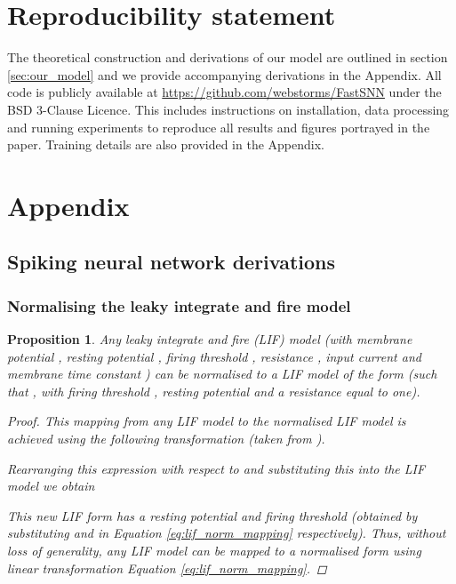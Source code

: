 \documentclass{article} \usepackage{iclr2023_conference,times}
\newtheorem{proposition}[theorem]{Proposition}
\begin{document}
\section{Reproducibility statement}
The theoretical construction and derivations of our model are outlined in section \ref{sec:our_model} and we provide accompanying derivations in the Appendix. All code is publicly available at \href{https://github.com/webstorms/FastSNN}{https://github.com/webstorms/FastSNN} under the BSD 3-Clause Licence. This includes instructions on installation, data processing and running experiments to reproduce all results and figures portrayed in the paper. Training details are also provided in the Appendix.




\appendix
\section{Appendix}

\subsection{Spiking neural network derivations}

\subsubsection{Normalising the leaky integrate and fire model}

\begin{proposition}
Any leaky integrate and fire (LIF) model  (with membrane potential , resting potential ,  firing threshold , resistance , input current  and membrane time constant ) can be normalised to a LIF model of the form  (such that , with firing threshold , resting potential  and a resistance equal to one).
\begin{proof}	

This mapping from any LIF model to the normalised LIF model is achieved using the following transformation (taken from \cite{hunsberger2018spiking}).



Rearranging this expression with respect to  and substituting this into  the LIF model we obtain



This new LIF form has a resting potential  and firing threshold  (obtained by substituting  and  in Equation \ref{eq:lif_norm_mapping} respectively). Thus, without loss of generality, any LIF model can be mapped to a normalised form using linear transformation Equation \ref{eq:lif_norm_mapping}.
\end{proof}
\end{proposition}
\end{document}
